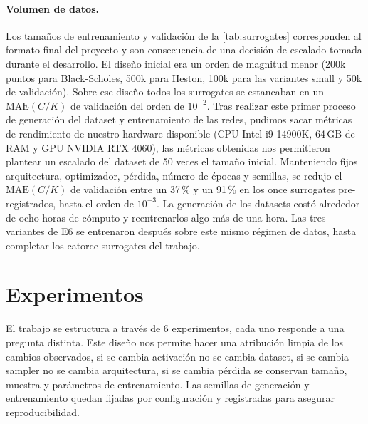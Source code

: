 \documentclass[11pt,a4paper]{article}
\begin{document}
\paragraph{Volumen de datos.}
Los tamaños de entrenamiento y validación de la \autoref{tab:surrogates} corresponden al formato final del proyecto y son consecuencia de una decisión de escalado tomada durante el desarrollo. El diseño inicial era un orden de magnitud menor (200k puntos para Black-Scholes, 500k para Heston, 100k para las variantes small y 50k de validación). Sobre ese diseño todos los surrogates se estancaban en un $\text{MAE}(C/K)$ de validación del orden de $10^{-2}$. Tras realizar este primer proceso de generación del dataset y entrenamiento de las redes, pudimos sacar métricas de rendimiento de nuestro hardware disponible (CPU Intel i9-14900K, 64\,GB de RAM y GPU NVIDIA RTX 4060), las métricas obtenidas nos permitieron plantear un escalado del dataset de 50 veces el tamaño inicial. Manteniendo fijos arquitectura, optimizador, pérdida, número de épocas y semillas, se redujo el $\text{MAE}(C/K)$ de validación entre un 37\,\% y un 91\,\% en los once surrogates pre-registrados, hasta el orden de $10^{-3}$. La generación de los datasets costó alrededor de ocho horas de cómputo y reentrenarlos algo más de una hora. Las tres variantes de E6 se entrenaron después sobre este mismo régimen de datos, hasta completar los catorce surrogates del trabajo.

\newpage

\section{Experimentos}\label{sec:experimentos}

El trabajo se estructura a través de 6 experimentos, cada uno responde a una pregunta distinta. Este diseño nos permite hacer una atribución limpia de los cambios observados, si se cambia activación no se cambia dataset, si se cambia sampler no se cambia arquitectura, si se cambia pérdida se conservan tamaño, muestra y parámetros de entrenamiento. Las semillas de generación y entrenamiento quedan fijadas por configuración y registradas para asegurar reproducibilidad.
\end{document}
